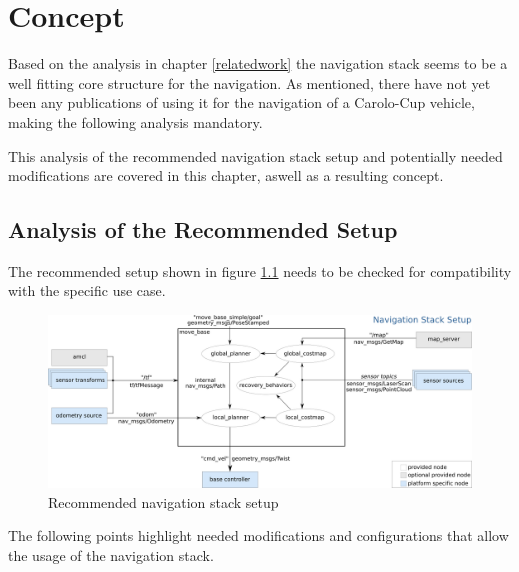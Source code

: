 \chapter{Concept}
\label{Concept}


Based on the analysis in chapter \ref{relatedwork} the navigation stack seems to be a well fitting core structure for the navigation. As mentioned, there have not yet been any publications of using it for the navigation of a Carolo-Cup vehicle, making the following analysis mandatory. 

This analysis of the recommended navigation stack setup and potentially needed modifications are covered in this chapter, aswell as a resulting concept.

\section{Analysis of the Recommended Setup}
The recommended setup shown in figure \ref{recnavsetup} needs to be checked for compatibility with the specific use case.

\begin{figure} 
	\includegraphics[width=\textwidth]{Pictures/navigation stack setup}
	\caption{Recommended navigation stack setup}
	\label{recnavsetup}
\end{figure}

The following points highlight needed modifications and configurations that allow the usage of the navigation stack.

